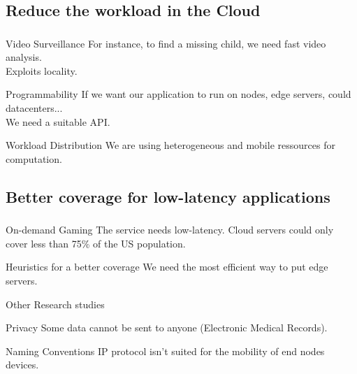 \documentclass[utf8,xcolor=table, page number]{earlywinter}
\begin{document}
\subsection{Reduce the workload in the Cloud}
\begin{frame}
  \frametitle{\secname}
  \framesubtitle{\subsecname}

  \begin{exampleblock}{Video Surveillance}
    For instance, to find a missing child, we need fast video analysis.\\
    Exploits locality.
  \end{exampleblock}

  \begin{alertblock}{Programmability}
    If we want our application to run on nodes, edge servers, could datacenters...\\
    We need a suitable API.
  \end{alertblock}

  \begin{alertblock}{Workload Distribution}
    We are using heterogeneous and mobile ressources for computation.
  \end{alertblock}
  
\end{frame}


\subsection{Better coverage for low-latency applications}
\begin{frame}
  \frametitle{\secname}
  \framesubtitle{\subsecname}

  \begin{exampleblock}{On-demand Gaming}
    The service needs low-latency. Cloud servers could only cover less than 75\% of the US population.
  \end{exampleblock}

  \begin{alertblock}{Heuristics for a better coverage}
    We need the most efficient way to put edge servers.
  \end{alertblock}
  
\end{frame}



\begin{frame}{Other Research studies} %
  
  \begin{alertblock}{Privacy}
    Some data cannot be sent to anyone (Electronic Medical Records).
  \end{alertblock}

  \begin{alertblock}{Naming Conventions}
    IP protocol isn't suited for the mobility of end nodes devices.
  \end{alertblock}

  
\end{frame}
\end{document}

